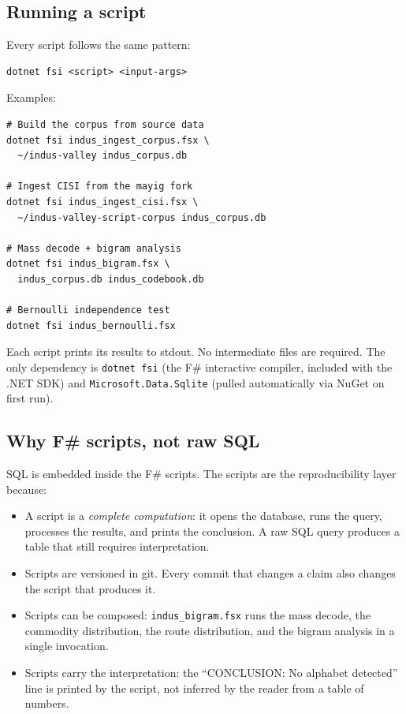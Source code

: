 \subsection{Running a script}

Every script follows the same pattern:

\begin{verbatim}
dotnet fsi <script> <input-args>
\end{verbatim}

\noindent
Examples:

\begin{verbatim}
# Build the corpus from source data
dotnet fsi indus_ingest_corpus.fsx \
  ~/indus-valley indus_corpus.db

# Ingest CISI from the mayig fork
dotnet fsi indus_ingest_cisi.fsx \
  ~/indus-valley-script-corpus indus_corpus.db

# Mass decode + bigram analysis
dotnet fsi indus_bigram.fsx \
  indus_corpus.db indus_codebook.db

# Bernoulli independence test
dotnet fsi indus_bernoulli.fsx
\end{verbatim}

\noindent
Each script prints its results to stdout. No intermediate files
are required. The only dependency is \texttt{dotnet fsi} (the
F\# interactive compiler, included with the .NET SDK) and
\texttt{Microsoft.Data.Sqlite} (pulled automatically via NuGet
on first run).

\subsection{Why F\# scripts, not raw SQL}

SQL is embedded inside the F\# scripts. The scripts are the
reproducibility layer because:

\begin{itemize}
\item A script is a \emph{complete computation}: it opens the
  database, runs the query, processes the results, and prints
  the conclusion. A raw SQL query produces a table that still
  requires interpretation.
\item Scripts are versioned in git. Every commit that changes a
  claim also changes the script that produces it.
\item Scripts can be composed: \texttt{indus\_bigram.fsx} runs the
  mass decode, the commodity distribution, the route distribution,
  and the bigram analysis in a single invocation.
\item Scripts carry the interpretation: the ``CONCLUSION: No
  alphabet detected'' line is printed by the script, not inferred
  by the reader from a table of numbers.
\end{itemize}

